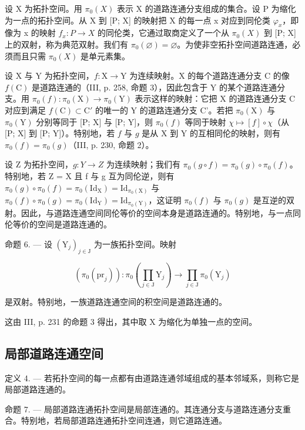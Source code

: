 设 X 为拓扑空间。用 \(\pi_{0}(X)\) 表示 X 的道路连通分支组成的集合。设 P 为缩化为一点的拓扑空间。从 X 到 {[}P; X{]} 的映射把 X 的每一点 x 对应到同伦类 \(\varphi_{x}\)，即像为 x 的映射 \(f_{x}: P \to X\) 的同伦类，它通过取商定义了一个从 \(\pi_{0}(X)\) 到 {[}P; X{]} 上的双射，称为典范双射。我们有 \(\pi_{0}(\varnothing) = \varnothing\)。为使非空拓扑空间道路连通，必须而且只需 \(\pi_{0}(X)\) 是单元素集。

设 X 与 Y 为拓扑空间，\(f\colon\mathrm{X}\to\mathrm{Y}\) 为连续映射。X 的每个道路连通分支 C 的像 \(f(\mathrm{C})\) 是道路连通的（III, p. 258, 命题 3），因此包含于 Y 的某个道路连通分支。用 \(\pi_{0}(f)\colon\pi_{0}(\mathrm{X})\to\pi_{0}(\mathrm{Y})\) 表示这样的映射：它把 X 的道路连通分支 C 对应到满足 \(f(\mathrm{C})\subset\mathrm{C}'\) 的唯一的 Y 的道路连通分支 C'。若把 \(\pi_0(\mathrm{X})\) 与 \(\pi_0(\mathrm{Y})\) 分别等同于 {[}P; X{]} 与 {[}P; Y{]}，则 \(\pi_0(f)\) 等同于映射 \(\chi \mapsto [f] \circ \chi\)（从 {[}P; X{]} 到 {[}P; Y{]}）。特别地，若 \(f\) 与 \(g\) 是从 X 到 Y 的互相同伦的映射，则有 \(\pi_0(f) = \pi_0(g)\)（III, p. 230, 命题 2）。

设 Z 为拓扑空间，\(g: Y \to Z\) 为连续映射；我们有 \(\pi_{0}(g \circ f) = \pi_{0}(g) \circ \pi_{0}(f)\)。特别地，若 Z = X 且 f 与 g 互为同伦逆，则有 \(\pi_{0}(g) \circ \pi_{0}(f) = \pi_{0}(\mathrm{Id}_{\mathrm{X}}) = \mathrm{Id}_{\pi_{0}(\mathrm{X})}\) 与 \(\pi_{0}(f) \circ \pi_{0}(g) = \pi_{0}(\mathrm{Id}_{\mathrm{Y}}) = \mathrm{Id}_{\pi_{0}(\mathrm{Y})}\)，这证明 \(\pi_{0}(f)\) 与 \(\pi_{0}(g)\) 是互逆的双射。因此，与道路连通空间同伦等价的空间本身是道路连通的。特别地，与一点同伦等价的空间是道路连通的。

命题 6. --- 设 \((\mathrm{Y}_{j})_{j\in\mathrm{J}}\) 为一族拓扑空间。映射

\[
(\pi_ {0} (\mathrm{pr} _ {j})) \colon \pi_ {0} (\prod_ {j \in \mathrm{J}} \mathrm{Y} _ {j}) \to \prod_ {j \in \mathrm{J}} \pi_ {0} (\mathrm{Y} _ {j})
\]

是双射。特别地，一族道路连通空间的积空间是道路连通的。

这由 III, p. 231 的命题 3 得出，其中取 X 为缩化为单独一点的空间。

\subsection{局部道路连通空间}

定义 4. --- 若拓扑空间的每一点都有由道路连通邻域组成的基本邻域系，则称它是局部道路连通的。

命题 7. --- 局部道路连通拓扑空间是局部连通的。其连通分支与道路连通分支重合。特别地，若局部道路连通拓扑空间连通，则它道路连通。

